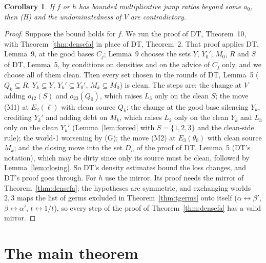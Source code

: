 \documentclass[11pt]{article}
\newtheorem{corollary}[theorem]{Corollary}
\theoremstyle{definition}\newtheorem{definition}[theorem]{Definition}
\theoremstyle{remark}\newtheorem{remark}[theorem]{Remark}
\begin{document}
\begin{corollary}\label{cor:factorfa}
If $f$ or $h$ has bounded multiplicative jump ratios beyond some $a_0$, then
(H) and the undominatedness of $V$ are contradictory.
\end{corollary}
\begin{proof}
Suppose the bound holds for $f$. We run the proof of DT, Theorem~10, with
Theorem~\ref{thm:densefa} in place of DT, Theorem~2. That proof applies DT,
Lemma~9, at the good bases $C_j$; Lemma~9 chooses the sets $Y$, $Y_0'$,
$M_0$, $R$ and $S$ of DT, Lemma~5, by conditions on densities and on the
advice of $C_j$ only, and we choose all of them clean. Then every set chosen
in the rounds of DT, Lemma~5 ($Q_k\subseteq R$, $Y_k\subseteq Y$,
$Y_k'\subseteq Y_0'$, $M_k\subseteq M_0$) is clean. The steps are: the
change at $V$ adding $o_{12}(S)$ and $o_{23}(Q_0)$, which raises $L_3$ only
on the clean $S$; the move (M1) at $E_2(\ell)$ with clean source $Q_k$; the
change at the good base silencing $Y_k$, crediting $Y_k'$ and adding debt on
$M_k$, which raises $L_2$ only on the clean $Y_k$ and $L_3$ only on the clean
$Y_k'$ (Lemma~\ref{lem:forced} with $S=\{1,2,3\}$ and the clean-side rule);
the world-1 worsening by (G); the move (M2) at $E_3(\theta_0)$ with clean
source $M_k$; and the closing move into the set $D_n$ of the proof of DT, Lemma~5
(DT's notation), which may be dirty since only
its source must be clean, followed by Lemma~\ref{lem:closing}. So DT's density
estimates bound the loss changes, and DT's proof goes through. For $h$ use the
mirror. Its proof needs the mirror of Theorem~\ref{thm:densefa}; the
hypotheses are symmetric, and exchanging worlds $2,3$ maps the list of
germs excluded in Theorem~\ref{thm:tgerms} onto itself ($\alpha\leftrightarrow
\beta'$, $\beta\leftrightarrow\alpha'$, $t\leftrightarrow1/t$), so every step
of the proof of Theorem~\ref{thm:densefa} has a valid mirror.
\end{proof}

\section{The main theorem}\label{sec:main}
\end{document}
